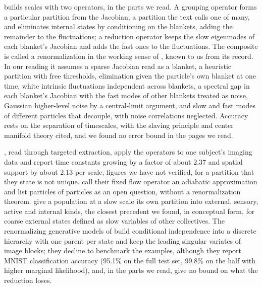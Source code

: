 \citet{friston2019free} builds scales with two operators, in the parts we read. A grouping operator forms a particular partition from the Jacobian, a partition the text calls one of many, and eliminates internal states by conditioning on the blankets, adding the remainder to the fluctuations; a reduction operator keeps the slow eigenmodes of each blanket's Jacobian and adds the fast ones to the fluctuations. The composite is called a renormalization in the working sense of \citet{lin2017deep}, known to us from its record. In our reading it assumes a sparse Jacobian read as a blanket, a heuristic partition with free thresholds, elimination given the particle's own blanket at one time, white intrinsic fluctuations independent across blankets, a spectral gap in each blanket's Jacobian with the fast modes of other blankets treated as noise, Gaussian higher-level noise by a central-limit argument, and slow and fast modes of different particles that decouple, with noise correlations neglected. Accuracy rests on the separation of timescales, with the slaving principle \citep{haken1983synergetics} and center manifold theory cited, and we found no error bound in the pages we read.

\citet{friston2021parcels}, read through targeted extraction, apply the operators to one subject's imaging data and report time constants growing by a factor of about 2.37 and spatial support by about 2.13 per scale, figures we have not verified, for a partition that they state is not unique. \citet{friston2023path} call their fixed flow operator an adiabatic approximation and list particles of particles as an open question, without a renormalization theorem. \citet{friston2023variational} give a population at a slow scale its own partition into external, sensory, active and internal kinds, the closest precedent we found, in conceptual form, for coarse external states defined as slow variables of other collectives. The renormalizing generative models of \citet{friston2025pixels} build conditional independence into a discrete hierarchy with one parent per state and keep the leading singular variates of image blocks; they decline to benchmark the examples, although they report MNIST classification accuracy (95.1\% on the full test set, 99.8\% on the half with higher marginal likelihood), and, in the parts we read, give no bound on what the reduction loses.

